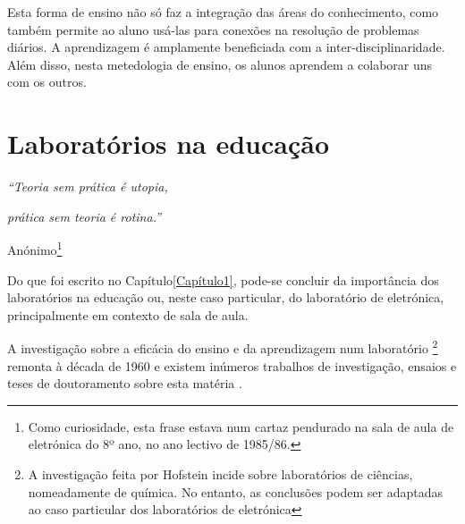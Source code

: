 


Esta forma de ensino não só faz a integração das áreas do conhecimento, como também permite ao aluno usá-las para conexões na resolução de problemas diários. A aprendizagem é amplamente beneficiada com a inter-disciplinaridade. Além disso, nesta metedologia de ensino, os alunos aprendem a colaborar uns com os outros.


\section{Laboratórios na educação}
\label{Laboratóriosnaeducação}

\begin{center}
    \textit{``Teoria sem prática é utopia,}

    \textit{prática sem teoria é rotina.''}

    Anónimo\footnote{Como curiosidade, esta frase estava num cartaz pendurado na sala de aula de eletrónica do 8º ano, no ano lectivo de 1985/86.}
\end{center}

Do que foi escrito no Capítulo\ref{Capítulo1}, pode-se concluir da importância dos laboratórios na educação ou, neste caso particular, do laboratório de eletrónica, principalmente em contexto de sala de aula. 

A investigação sobre a eficácia do ensino e da aprendizagem num laboratório \footnote{A investigação feita por Hofstein \cite{Hofstein} incide sobre laboratórios de ciências, nomeadamente de química. No entanto, as conclusões podem ser adaptadas ao caso particular dos laboratórios de eletrónica} remonta à década de 1960 e existem inúmeros trabalhos de investigação, ensaios e teses de doutoramento sobre esta matéria \cite{Hofstein}.

